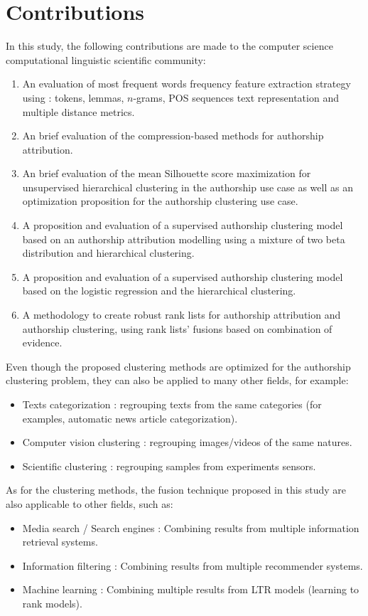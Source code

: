 \section{Contributions}

In this study, the following contributions are made to the computer science computational linguistic scientific community:

\begin{enumerate}
  \item
  An evaluation of most frequent words frequency feature extraction strategy using : tokens, lemmas, $n$-grams, POS sequences text representation and multiple distance metrics.
  \item
  An brief evaluation of the compression-based methods for authorship attribution.
  \item
  An brief evaluation of the mean Silhouette score maximization for unsupervised hierarchical clustering in the authorship use case as well as an optimization proposition for the authorship clustering use case.
  \item
  A proposition and evaluation of a supervised authorship clustering model based on an authorship attribution modelling using a mixture of two beta distribution and hierarchical clustering.
  \item
  A proposition and evaluation of a supervised authorship clustering model based on the logistic regression and the hierarchical clustering.
  \item
  A methodology to create robust rank lists for authorship attribution and authorship clustering, using rank lists' fusions based on combination of evidence.
\end{enumerate}

Even though the proposed clustering methods are optimized for the authorship clustering problem, they can also be applied to many other fields, for example:
\begin{itemize}
  \item
  Texts categorization : regrouping texts from the same categories (for examples, automatic news article categorization).
  \item
  Computer vision clustering : regrouping images/videos of the same natures.
  \item
  Scientific clustering : regrouping samples from experiments sensors.
\end{itemize}

As for the clustering methods, the fusion technique proposed in this study are also applicable to other fields, such as:
\begin{itemize}
  \item
  Media search / Search engines : Combining results from multiple information retrieval systems.
  \item
  Information filtering : Combining results from multiple recommender systems.
  \item
  Machine learning : Combining multiple results from LTR models (learning to rank models).
\end{itemize}
